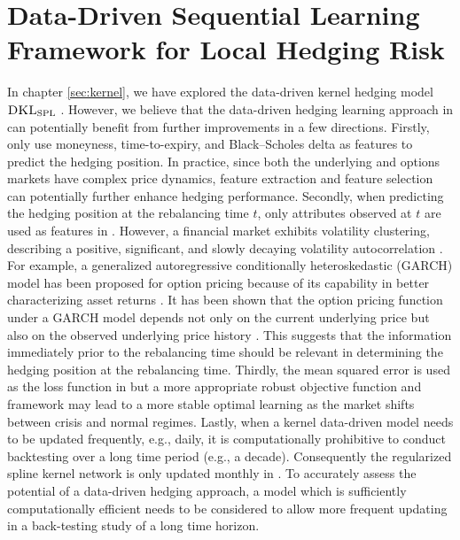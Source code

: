 \documentclass[letterpaper,12pt,titlepage,oneside,final]{book}
\numberwithin{equation}{section}
\theoremstyle{definition}
\newcommand{\DKLs}{\bf\textsc{DKL}_{\text{SPL}}}
\begin{document}
\chapter{Data-Driven Sequential Learning Framework for Local Hedging Risk}
\label{sec:RNNLocal}
In chapter \ref{sec:kernel}, we have explored the  data-driven kernel hedging  model $\DKLs$ \cite{knian2017}. However, we believe that the data-driven hedging learning approach in \cite{knian2017} can potentially benefit from further improvements in a few directions.
Firstly,  \citet{knian2017}  only use moneyness, time-to-expiry, and Black–Scholes delta as features to predict the hedging position. In practice, since both the underlying and options markets have complex price dynamics,
 feature extraction and feature selection can potentially further enhance hedging performance.
Secondly, when predicting the hedging position at the rebalancing time $t$, only attributes observed at $t$ are used as features in \cite{knian2017}.  However, a financial market exhibits volatility clustering,   describing a positive, significant, and slowly decaying volatility autocorrelation  \citep{mandelbrot1963variation}.  For example,  a generalized autoregressive conditionally heteroskedastic (GARCH) model has been proposed for option pricing because of its capability in better characterizing asset returns \citep{heston2000closed} .  It has been shown that the option pricing function under a GARCH model depends not only on the current underlying price but also on the observed underlying price history \citep{duan2006approximating,heston2000closed}.   This suggests that the information immediately prior to the rebalancing time should be relevant in determining the hedging position at the rebalancing time.
Thirdly,  the mean squared error is used as the loss function in \cite{knian2017} but
a more appropriate robust objective function and framework may lead to a more stable optimal learning as the market shifts between crisis and normal regimes.
Lastly, when a kernel data-driven model needs to be updated frequently, e.g., daily, it is computationally prohibitive to conduct backtesting over a long time period (e.g., a decade). 
Consequently the regularized spline kernel network is only updated monthly in  \cite{knian2017}.  To accurately assess the potential of a data-driven hedging approach,  a model which is sufficiently computationally efficient needs to be considered to allow more frequent updating in a back-testing study of a long time horizon.
\end{document}
